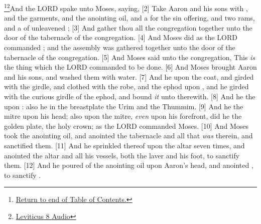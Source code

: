 \footnote{\textcolor[cmyk]{0.99998,1,0,0}{\hyperlink{TOC}{Return to end of Table of Contents.}}}\footnote{\href{https://audiobible.com/bible/leviticus_8.html}{\textcolor[cmyk]{0.99998,1,0,0}{Leviticus 8 Audio}}}\textcolor[cmyk]{0.99998,1,0,0}{And the LORD spake unto Moses, saying,}
[2] \textcolor[cmyk]{0.99998,1,0,0}{Take Aaron and his sons with , and the garments, and the anointing oil, and a  for the sin offering, and two rams, and a  of unleavened ;}
[3] \textcolor[cmyk]{0.99998,1,0,0}{And gather thou all the congregation together unto the door of the tabernacle of the congregation.}
[4] \textcolor[cmyk]{0.99998,1,0,0}{And Moses did as the LORD commanded ; and the assembly was gathered together unto the door of the tabernacle of the congregation.}
[5] \textcolor[cmyk]{0.99998,1,0,0}{And Moses said unto the congregation, This \emph{is} the thing which the LORD commanded to be done.}
[6] \textcolor[cmyk]{0.99998,1,0,0}{And Moses brought Aaron and his sons, and washed them with water.}
[7] \textcolor[cmyk]{0.99998,1,0,0}{And he  upon  the coat, and girded  with the girdle, and clothed  with the robe, and  the ephod upon , and he girded  with the curious girdle of the ephod, and bound \emph{it} unto  therewith.}
[8] \textcolor[cmyk]{0.99998,1,0,0}{And he  the  upon : also he  in the breastplate the Urim and the Thummim.}
[9] \textcolor[cmyk]{0.99998,1,0,0}{And he  the mitre upon his head; also upon the mitre, \emph{even} upon his forefront, did he  the golden plate, the holy crown; as the LORD commanded Moses.}
[10] \textcolor[cmyk]{0.99998,1,0,0}{And Moses took the anointing oil, and anointed the tabernacle and all that \emph{was} therein, and sanctified them.}
[11] \textcolor[cmyk]{0.99998,1,0,0}{And he sprinkled thereof upon the altar seven times, and anointed the altar and all his vessels, both the laver and his foot, to sanctify them.}
[12] \textcolor[cmyk]{0.99998,1,0,0}{And he poured of the anointing oil upon Aaron's head, and anointed , to sanctify .}
